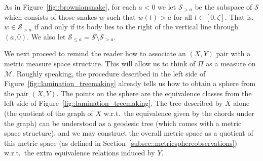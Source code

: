 \documentclass[JEP,XML,SOM,Unicode]{cedram}
\let\mathcal\mathscr
\theoremstyle{plain}
\numberwithin{theorem}{section}
\theoremstyle{definition}
\newcommand{\snake}{{\mathcal S}}
\newcommand\mmspace{{\mathcal M}}
\let\snakeexcursionmeasure \Pi
\begin{document}
As in Figure~\ref{fig::browniansnake}, for each $a < 0$ we let $\snake_{>a}$ be the subspace of $\snake$ which consists of those snakes $w$ such that $w(t) > a$ for all $t \in [0,\zeta]$. That is, $w \in \snake_{>a}$ if and only if its body lies to the right of the vertical line through $(a,0)$. We also let $\snake_{\leq a} = \snake \setminus \snake_{>a}$.

We next proceed to remind the reader how to associate an $(X,Y)$ pair with a metric measure space structure. This will allow us to think of $\snakeexcursionmeasure$ as a measure on $\mmspace$. Roughly speaking, the procedure described in the left side of Figure~\ref{fig::lamination_treemaking} already tells us how to obtain a sphere from the pair $(X,Y)$. The points on the sphere are the equivalence classes from the left side of Figure~\ref{fig::lamination_treemaking}. The tree described by $X$ alone (the quotient of the graph of $X$ w.r.t.\ the equivalence given by the chords under the graph) can be understood as a geodesic tree (which comes with a metric space structure), and we may construct the overall metric space as a quotient of this metric space (as defined in Section~\ref{subsec::metricsphereobservations}) w.r.t.\ the extra equivalence relations induced by $Y$.
\end{document}
